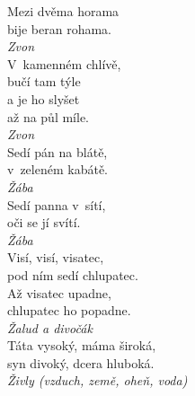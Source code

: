 \begin{multicols}{3}
\noindent
Mezi dvěma horama\\
bije beran rohama.\\[1 mm]
{\sl Zvon}\\

\noindent
V~kamenném chlívě,\\
bučí tam týle\\
a je ho slyšet\\
až na půl míle.\\[1 mm]
{\sl Zvon}\\

\noindent
Sedí pán na blátě,\\
v~zeleném kabátě.\\[1 mm]
{\sl Žába}\\

\noindent
Sedí panna v~sítí,\\
oči se jí svítí.\\[1 mm]
{\sl Žába}\\

\noindent
Visí, visí, visatec,\\
pod ním sedí chlupatec.\\
Až visatec upadne,\\
chlupatec ho popadne.\\[1 mm]
{\sl Žalud a divočák}\\

\noindent
Táta vysoký, máma široká,\\
syn divoký, dcera hluboká.\\[1 mm]
{\sl Živly (vzduch, země, oheň, voda)}\\

\end{multicols}
\clearpage

